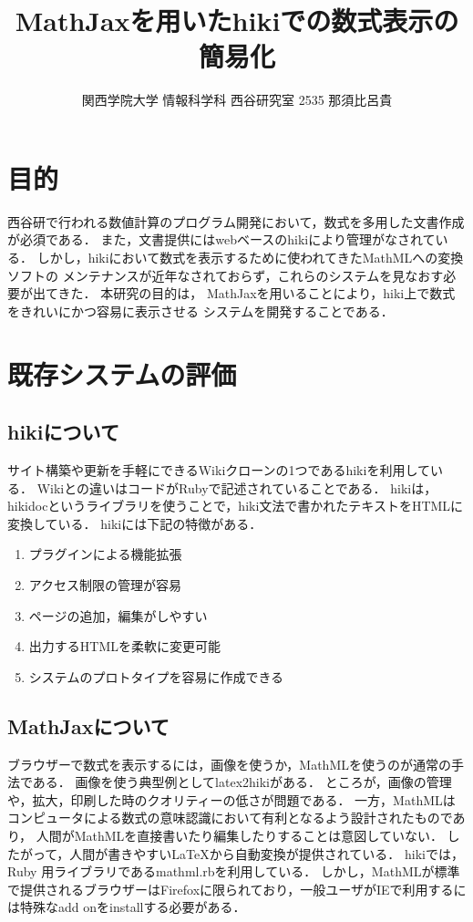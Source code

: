 \documentclass[10pt,a4j,twocolumn]{jsarticle}
\begin{document}
\title{MathJaxを用いたhikiでの数式表示の簡易化}
\author{関西学院大学 情報科学科 西谷研究室 2535 那須比呂貴}
\date{}
\maketitle
\section{目的}
西谷研で行われる数値計算のプログラム開発において，数式を多用した文書作成が必須である．
また，文書提供にはwebベースのhikiにより管理がなされている．
しかし，hikiにおいて数式を表示するために使われてきたMathMLへの変換ソフトの
メンテナンスが近年なされておらず，これらのシステムを見なおす必要が出てきた．
本研究の目的は，
MathJaxを用いることにより，hiki上で数式をきれいにかつ容易に表示させる
システムを開発することである．

\section{既存システムの評価}
\subsection{hikiについて}
サイト構築や更新を手軽にできるWikiクローンの1つであるhikiを利用している．
Wikiとの違いはコードがRubyで記述されていることである．
hikiは，hikidocというライブラリを使うことで，hiki文法で書かれたテキストをHTMLに変換している．
hikiには下記の特徴がある．
\begin{enumerate}
\item プラグインによる機能拡張
\item アクセス制限の管理が容易
\item ページの追加，編集がしやすい
\item 出力するHTMLを柔軟に変更可能
\item システムのプロトタイプを容易に作成できる
\end{enumerate}
\subsection{MathJaxについて}
ブラウザーで数式を表示するには，画像を使うか，MathMLを使うのが通常の手法である．
画像を使う典型例としてlatex2hikiがある．
ところが，画像の管理や，拡大，印刷した時のクオリティーの低さが問題である．
一方，MathMLはコンピュータによる数式の意味認識において有利となるよう設計されたものであり，
人間がMathMLを直接書いたり編集したりすることは意図していない．
したがって，人間が書きやすい\LaTeX から自動変換が提供されている．
hikiでは，Ruby 用ライブラリであるmathml.rbを利用している\cite{hiraku}．
しかし，MathMLが標準で提供されるブラウザーはFirefoxに限られており，一般ユーザがIEで利用するには特殊なadd onをinstallする必要がある．
\end{document}
